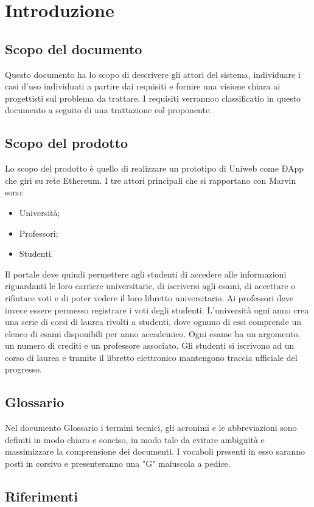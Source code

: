 \section{Introduzione}
\subsection{Scopo del documento}
Questo documento ha lo scopo di descrivere gli attori del sistema, individuare i casi d'uso individuati a partire dai requisiti e fornire una visione chiara ai progettisti sul problema da trattare. I requisiti verrannoo classificatio in questo documento a seguito di una trattazione col proponente.

\subsection{Scopo del prodotto}
Lo scopo del prodotto è quello di realizzare un prototipo di Uniweb come ÐApp che giri su rete Ethereum. I tre attori principali che si rapportano con Marvin sono:
\begin{itemize}
	\item Università;
	\item Professori;
	\item Studenti.
\end{itemize} 
Il portale deve quindi permettere agli studenti di accedere alle informazioni riguardanti le loro carriere universitarie, di iscriversi agli esami, di accettare o rifiutare voti e di poter vedere il loro libretto universitario.
Ai professori deve invece essere permesso registrare i voti degli studenti.
L'università ogni anno crea una serie di corsi di laurea rivolti a studenti, dove ognuno di essi comprende un elenco di esami disponibili per anno accademico. Ogni esame ha un argomento, un numero di crediti e un professore associato. Gli studenti si iscrivono ad un corso di laurea e tramite il libretto elettronico mantengono traccia ufficiale del progresso.

\subsection{Glossario}
Nel documento Glossario i termini tecnici, gli acronimi e le abbreviazioni sono definiti in modo chiaro e conciso, in modo tale da evitare ambiguità e massimizzare la comprensione dei documenti.
\newline I vocaboli presenti in esso saranno posti in corsivo e presenteranno una "G" maiuscola a pedice.
\subsection{Riferimenti}
